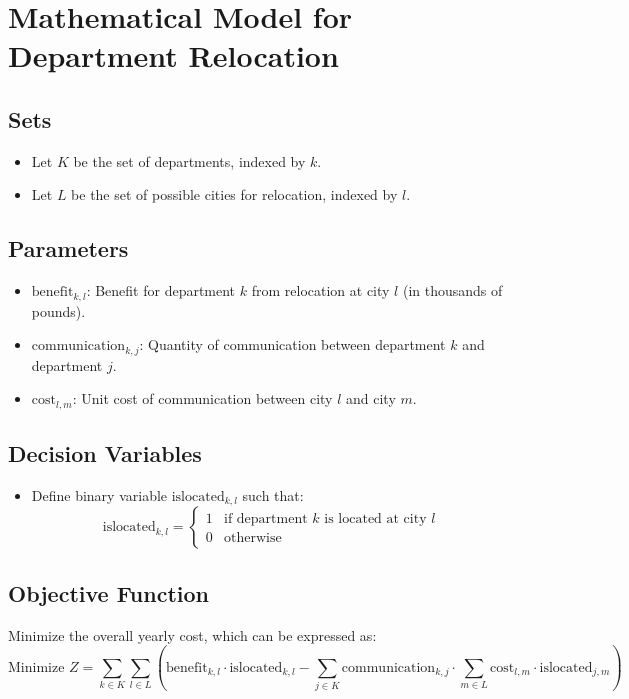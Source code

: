 \documentclass{article}
\begin{document}
\section*{Mathematical Model for Department Relocation}

\subsection*{Sets}
\begin{itemize}
    \item Let \( K \) be the set of departments, indexed by \( k \).
    \item Let \( L \) be the set of possible cities for relocation, indexed by \( l \).
\end{itemize}

\subsection*{Parameters}
\begin{itemize}
    \item \( \text{benefit}_{k,l} \): Benefit for department \( k \) from relocation at city \( l \) (in thousands of pounds).
    \item \( \text{communication}_{k,j} \): Quantity of communication between department \( k \) and department \( j \).
    \item \( \text{cost}_{l,m} \): Unit cost of communication between city \( l \) and city \( m \).
\end{itemize}

\subsection*{Decision Variables}
\begin{itemize}
    \item Define binary variable \( \text{islocated}_{k,l} \) such that:
    \[
    \text{islocated}_{k,l} =
    \begin{cases}
    1 & \text{if department } k \text{ is located at city } l \\
    0 & \text{otherwise}
    \end{cases}
    \]
\end{itemize}

\subsection*{Objective Function}
Minimize the overall yearly cost, which can be expressed as:
\[
\text{Minimize } Z = \sum_{k \in K} \sum_{l \in L} \left( \text{benefit}_{k,l} \cdot \text{islocated}_{k,l} - \sum_{j \in K} \text{communication}_{k,j} \cdot \sum_{m \in L} \text{cost}_{l,m} \cdot \text{islocated}_{j,m} \right)
\]
\end{document}

